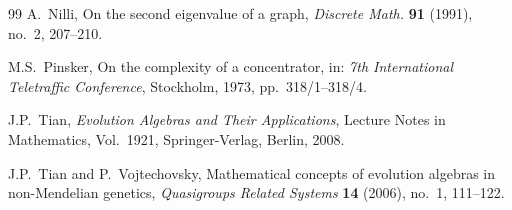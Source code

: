 \documentclass[12pt,a4paper]{amsart}
\theoremstyle{definition}
\begin{document}
\begin{thebibliography}{99}
A.\ Nilli,
On the second eigenvalue of a graph,
\emph{Discrete Math.} \textbf{91} (1991), no.\ 2, 207--210.

M.S.\ Pinsker,
On the complexity of a concentrator,
in: \emph{7th International Teletraffic Conference}, Stockholm, 1973, pp.\ 318/1--318/4.

J.P.\ Tian,
\emph{Evolution Algebras and Their Applications},
Lecture Notes in Mathematics, Vol.\ 1921,
Springer-Verlag, Berlin, 2008.

J.P.\ Tian and P.\ Vojtechovsky,
Mathematical concepts of evolution algebras in non-Mendelian genetics,
\emph{Quasigroups Related Systems} \textbf{14} (2006), no.\ 1, 111--122.

\end{thebibliography}
\end{document}
